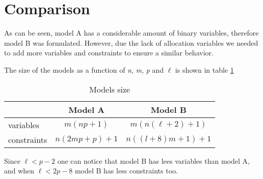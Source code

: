 \section{Comparison}
As can be seen,
model A
has a considerable amount of binary variables,
therefore model B was formulated.
However, due the lack of allocation variables
we needed to add more variables and constraints
to ensure a similar behavior.

The size of the models
as a function of \textit{n}, \textit{m}, \textit{p} and $\ell$
is shown in table \ref{tab:modsize}

\begin{table}[h]
  \label{tab:modsize}
  \centering
  \begin{tabular}{c|c|c|}
    \cline{2-3}
    & Model A & Model B \\ \hline
    \multicolumn{1}{|l|}{variables} &
    $m(np+1)$ &
    $m(n(\ell+2)+1)$ \\ \hline
    \multicolumn{1}{|l|}{constraints} &
    $n(2mp+p)+1$ &
    $n((l+8)m+1)+1$ \\ \hline
  \end{tabular}
  \caption{Models size}
\end{table}

Since $\ell < p - 2$
one can notice
that model B
has lees variables
than model A,
and when $\ell < 2p - 8$
model B has
less constraints too.
